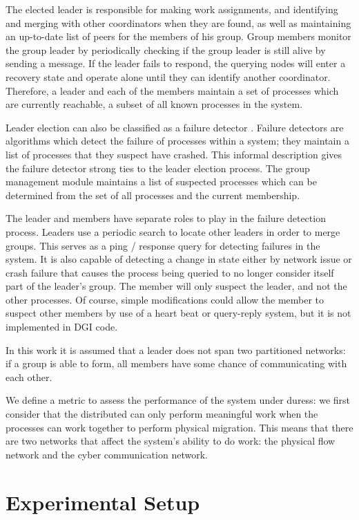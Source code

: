 The elected leader is responsible for making work assignments, and identifying and merging with other coordinators when they are found, as well as maintaining an up-to-date list of peers for the members of his group. 
Group members monitor the group leader by periodically checking if the group leader is still alive by sending a message. 
If the leader fails to respond, the querying nodes will enter a recovery state and operate alone until
they can identify another coordinator.
Therefore, a leader and each of the members maintain a set of processes which are currently reachable, a subset of all known processes in the system.

Leader election can also be classified as a failure detector \cite{LEADERELECTIONEVAL}.
Failure detectors are algorithms which detect the failure of processes within a system; they maintain a list of processes that they suspect have crashed.
This informal description gives the failure detector strong ties to the leader election process. 
The group management module maintains a list of suspected processes which can be determined from the set of all processes and the current membership.

The leader and members have separate roles to play in the failure detection
process. Leaders use a periodic search to locate other leaders in order to merge groups.
 This serves as a ping / response query for
detecting failures in the system. It is also capable of detecting a change in state either
by network issue or crash failure that causes the process being queried to no
longer consider itself part of the leader's group. The member will only suspect the leader, and not the other processes.
Of course, simple modifications could allow the member to suspect other members
by use of a heart beat or query-reply system, but it is not implemented in DGI code.

In this work it is assumed that a leader does not span two partitioned networks:
if a group is able to form, all members have some chance of communicating with
each other.

We define a metric to assess the performance of the system under duress: we
first consider that the distributed can only perform meaningful work when the
processes can work together to perform physical migration. This means that
there are two networks that affect the system's ability to do work: the
physical flow network and the cyber communication network.

\section {Experimental Setup}

